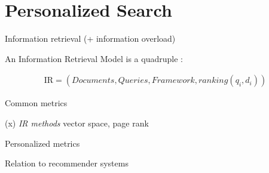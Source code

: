 \section{Personalized Search}

Information retrieval (+ information overload)

An Information Retrieval Model is a quadruple \citep[p23]{Baeza-Yates1999}:

\begin{eqnarray}
  \mathrm{IR} = (Documents, Queries, Framework, ranking(q_i, d_i))
\end{eqnarray}

Common metrics

(x) \emph{IR methods} vector space, page rank

Personalized metrics

Relation to recommender systems



